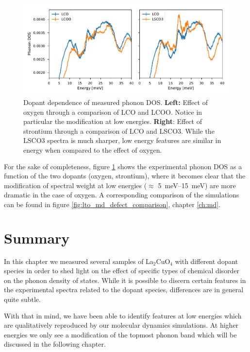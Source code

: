 \begin{figure}
    \centering
    \includegraphics[width=\textwidth]{fig/gdos/in4_low_energy_compare.pdf}
    \caption{Dopant dependence of measured phonon DOS. \textbf{Left:} Effect of oxygen through a comparison of LCO and LCOO. Notice in particular the modification at low energies. \textbf{Right}: Effect of strontium through a comparison of LCO and LSCO3. While the LSCO3 spectra is much sharper, low energy features are similar in energy when compared to the effect of oxygen.}
    \label{fig:in4_low_energy_compare}
\end{figure}

For the sake of completeness, figure \ref{fig:in4_low_energy_compare} shows the experimental phonon DOS as a function of the two dopants (oxygen, strontium), where it becomes clear that the modification of spectral weight at low energies ($\approx$ \SIrange{5}{15}{\milli\eV}) are more dramatic in the case of oxygen. A corresponding comparison of the simulations can be found in figure \ref{fig:lto_md_defect_comparison}, chapter \ref{ch:md}.

\section{Summary}
In this chapter we measured several samples of La$_2$CuO$_4$ with different dopant species in order to shed light on the effect of specific types of chemical disorder on the phonon density of states. While it is possible to discern certain features in the experimental spectra related to the dopant species, differences are in general quite subtle.

With that in mind, we have been able to identify features at low energies which are qualitatively reproduced by our molecular dynamics simulations. At higher energies we only see a modification of the topmost phonon band which will be discussed in the following chapter.

